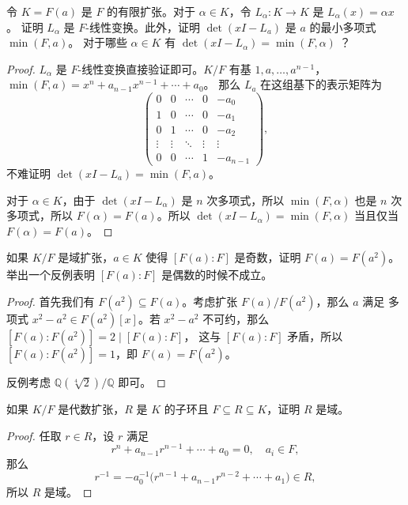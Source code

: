 \begin{problem}
  令 $K=F(a)$ 是 $F$ 的有限扩张。对于 $\alpha\in K$，令 $L_\alpha:K\to K$ 是 $L_\alpha(x)=\alpha x$。
  证明 $L_\alpha$ 是 $F$-线性变换。此外，证明 $\det(xI-L_a)$ 是 $a$ 的最小多项式 $\min(F,a)$。
  对于哪些 $\alpha\in K$ 有 $\det(xI-L_\alpha)=\min (F,\alpha)$ ？
\end{problem}
\begin{proof}
  $L_\alpha$ 是 $F$-线性变换直接验证即可。$K/F$ 有基 $1,a,\dots,a^{n-1}$，
  $\min(F,a)=x^n+a_{n-1}x^{n-1}+\cdots+a_0$。
  那么 $L_a$ 在这组基下的表示矩阵为
  \[
    \begin{pmatrix}
      0 & 0 & \cdots & 0 & -a_0\\
      1 & 0 & \cdots & 0 & -a_1\\
      0 & 1 & \cdots & 0 & -a_2\\
      \vdots & \vdots & \ddots & \vdots & \vdots \\
      0 & 0 & \cdots & 1 & -a_{n-1}
    \end{pmatrix},
  \]
  不难证明 $\det(xI-L_a)=\min (F,a)$。 

  对于 $\alpha\in K$，由于 $\det(xI-L_\alpha)$ 是 $n$ 次多项式，所以 $\min (F,\alpha)$
  也是 $n$ 次多项式，所以 $F(\alpha)=F(a)$。所以 $\det(xI-L_\alpha)=\min(F,\alpha)$
  当且仅当 $F(\alpha)=F(a)$。
\end{proof}

\begin{problem}
  如果 $K/F$ 是域扩张，$a\in K$ 使得 $[F(a):F]$ 是奇数，证明 $F(a)=F(a^2)$。
  举出一个反例表明 $[F(a):F]$ 是偶数的时候不成立。
\end{problem}
\begin{proof}
  首先我们有 $F(a^2)\subseteq F(a)$。考虑扩张 $F(a)/F(a^2)$，那么 $a$ 满足
  多项式 $x^2-a^2\in F(a^2)[x]$。若 $x^2-a^2$ 不可约，那么 $[F(a):F(a^2)]=2 \mid [F(a):F]$，
  这与 $[F(a):F]$ 矛盾，所以 $[F(a):F(a^2)]=1$，即 $F(a)=F(a^2)$。

  反例考虑 $\mathbb{Q}(\sqrt[4]{2})/ \mathbb{Q}$ 即可。
\end{proof}

\begin{problem}
  如果 $K/F$ 是代数扩张，$R$ 是 $K$ 的子环且 $F\subseteq R\subseteq K$，证明 $R$
  是域。
\end{problem}
\begin{proof}
  任取 $r\in R$，设 $r$ 满足
  \[
    r^n+a_{n-1}r^{n-1}+\cdots+a_0=0,\quad a_i\in F,
  \]
  那么
  \[
    r^{-1}=-a_0^{-1}\bigl(r^{n-1}+a_{n-1}r^{n-2}+\cdots+a_1\bigr)\in R,
  \]
  所以 $R$ 是域。
\end{proof}

